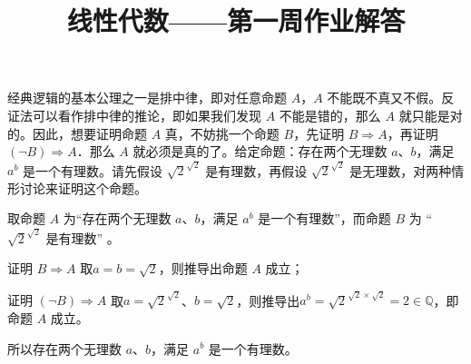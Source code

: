

\title{\textbf{线性代数——第一周作业解答}}


	\maketitle
	
	\iffalse week 1
	练习 0.2.2
	练习 0.3.1
	练习 0.3.4
	练习 0.3.9
	练习 1.1.2
	练习 1.1.5
	练习 1.1.8
	\fi
	
	\begin{exercise}[0.2.2]
		经典逻辑的基本公理之一是排中律，即对任意命题 $A$，$A$ 不能既不真又不假。反证法可以看作排中律的推论，即如果我们发现 $A$ 不能是错的，那么 $A$ 就只能是对的。因此，想要证明命题 $A$ 真，不妨挑一个命题 $B$，先证明 $B\Rightarrow A$，再证明 $(\neg B)\Rightarrow A$．那么 $A$ 就必须是真的了。给定命题：存在两个无理数 $a$、$b$，满足 $a^{b}$ 是一个有理数。请先假设 $\sqrt{2}^{\sqrt{2}}$ 是有理数，再假设 $\sqrt{2}^{\sqrt{2}}$ 是无理数，对两种情形讨论来证明这个命题。
	\end{exercise}
	
	\begin{solution}
		取命题 $A$ 为“存在两个无理数 $a$、$b$，满足 $a^{b}$ 是一个有理数”，而命题 $B$ 为 “$\sqrt{2}^{\sqrt{2}}$ 是有理数” 。
		
		\begin{case}{1}{证明 $B\Rightarrow A$}
			取$a=b=\sqrt{2}$，则推导出命题 $A$ 成立；
		\end{case}
		\begin{case}{2}{证明 $(\neg B)\Rightarrow A$}
			取$a=\sqrt{2}^{\sqrt{2}}$、$b=\sqrt{2}$，则推导出$a^{b}=\sqrt{2}^{\sqrt{2}\times\sqrt{2}}=2\in\mathbb{Q}$，即命题 $A$ 成立。
		\end{case}
		所以存在两个无理数 $a$、$b$，满足 $a^{b}$ 是一个有理数。
	\end{solution}
	
